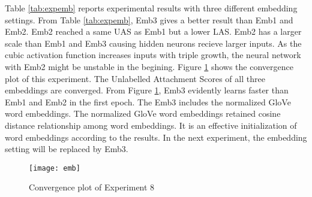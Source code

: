 Table \ref{tab:expemb} reports experimental results with three different embedding settings. From Table \ref{tab:expemb}, Emb3 gives a better result than Emb1 and Emb2. Emb2 reached a same UAS as Emb1 but a lower LAS. Emb2 has a larger scale than Emb1 and Emb3 causing hidden neurons recieve larger inputs. As the cubic activation function increases inputs with triple growth, the neural network with Emb2 might be unstable in the begining. Figure \ref{fig:convergemb} shows the convergence plot of this experiment. The Unlabelled Attachment Scores of all three embeddings are converged. From Figure \ref{fig:convergemb}, Emb3 evidently learns faster than Emb1 and Emb2 in the first epoch. The Emb3 includes the normalized GloVe word embeddings. The normalized GloVe word embeddings retained cosine distance relationship among word embeddings. It is an effective initialization of word embeddings according to the results. In the next experiment, the embedding setting will be replaced by Emb3.
\begin{figure}
  \centering
    \texttt{[image: emb]}
  \caption{Convergence plot of Experiment 8}
  \label{fig:convergemb}
\end{figure}


